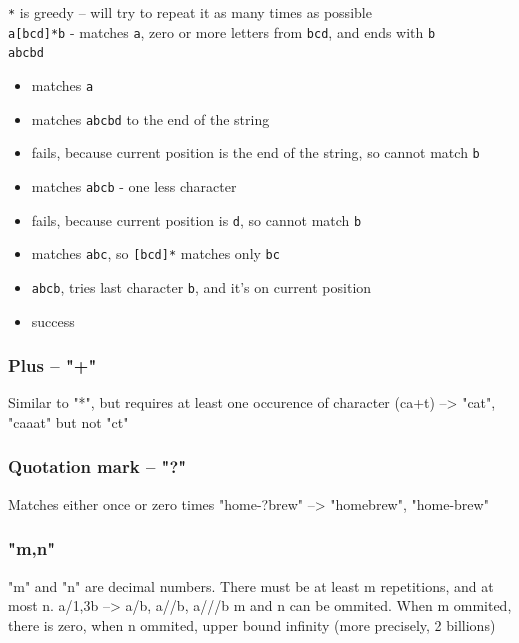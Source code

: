 \documentclass{beamer}
\begin{document}
\begin{frame}
\verb/*/ is greedy -- will try to repeat it as many times as possible \\
\verb/a[bcd]*b/ - matches \verb/a/, zero or more letters from \verb/bcd/, and ends with \verb/b/ \\
\verb/abcbd/
\begin{itemize}
\item matches \verb/a/
\item matches \verb/abcbd/ to the end of the string
\item fails, because current position is the end of the string, so cannot match \verb/b/
\item matches \verb/abcb/ - one less character
\item fails, because current position is \verb/d/, so cannot match \verb/b/
\item matches \verb/abc/, so \verb/[bcd]*/ matches only \verb/bc/
\item \verb/abcb/, tries last character \verb/b/, and it's on current position
\item success
\end{itemize}
\end{frame}

\subsubsection{Plus -- "+"}
\begin{frame}
Similar to "*", but requires at least one occurence of character
(ca+t) --> "cat", "caaat" but not "ct"
\end{frame}

\subsubsection{Quotation mark -- "?"}
\begin{frame}
Matches either once or zero times
"home-?brew" --> "homebrew", "home-brew"
\end{frame}

\subsubsection{"{m,n}"}
\begin{frame}
"m" and "n" are decimal numbers. There must be at least m repetitions, and at most n.
a/{1,3}b --> a/b, a//b, a///b
\pause
m and n can be ommited. When m ommited, there is zero, when n ommited, upper bound infinity (more precisely, 2 billions)
\end{frame}
\end{document}
